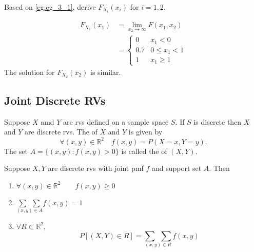 \documentclass[notoc,notitlepage]{tufte-book}
\begin{document}
\begin{eg}
  Based on \cref{eg:eg_3_1}, derive $F_{X_i}(x_i)$ for $i = 1, 2$.

  \begin{solution}
    \begin{align*}
      F_{X_1} (x_1) &= \lim_{x_2 \to \infty} F(x_1, x_2) \\
          &= \begin{cases}
            0   & x_1 < 0 \\
            0.7 & 0 \leq x_1 < 1 \\
            1   & x_1 \geq 1
          \end{cases}
    \end{align*}
    The solution for $F_{X_2}(x_2)$ is similar.
  \end{solution}
\end{eg}


\subsection{Joint Discrete RVs}%
\label{sub:joint_discrete_rvs}

\begin{defn}
\label{defn:joint_discrete_rv}
  Suppose $X$ amd $Y$ are rvs defined on a sample space $S$. If $S$ is discrete then $X$ and $Y$ are discrete rvs. The  of $X$ and $Y$ is given by
  \begin{equation*}
    \forall (x, y) \in \mathbb{R}^2 \quad f(x, y) = P(X = x, Y = y).
  \end{equation*}
  The set $A = \{(x, y) : f(x, y) > 0\}$ is called the  of $(X, Y)$.
\end{defn}

\begin{propo}
\label{propo:properties_of_joint_pmf}
  Suppose $X, Y$ are discrete rvs with joint pmf $f$ and support set $A$. Then
  \begin{enumerate}
    \item $\forall (x, y) \in \mathbb{R}^2 \qquad f(x, y) \geq 0$
    \item $\underset{(x, y) \in A}{\sum \enspace \sum} f(x, y) = 1$
    \item $\forall R \subset \mathbb{R}^2$,
      \begin{equation*}
        P[ (X, Y) \in R ] = \underset{(x, y) \in R}{\sum \enspace \sum} f(x, y)
      \end{equation*}
  \end{enumerate}
\end{propo}
\end{document}
